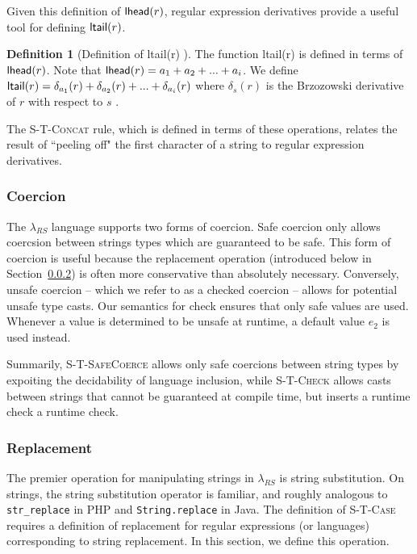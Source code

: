 \documentclass[9pt]{sig-alternate}
\theoremstyle{definition}
\newtheorem{defn}[thm]{Definition}
\newcommand{\lambdas}{\lambda_{RS}}
\newcommand{\lhead}[1]{ {\sf lhead}(#1) }
\newcommand{\ltail}[1]{ {\sf ltail}(#1) }
\begin{document}
Given this definition of $\lhead{r}$, regular expression derivatives provide a useful tool for defining $\ltail{r}$.

\begin{defn}[Definition of \ltail{r}]
The function \ltail{r} is defined in terms of $\lhead{r}$.
Note that $\lhead{r} = a_1 + a_2 + ... + a_i$.
We define $\ltail{r} = \delta_{a_1}(r) + \delta_{a_2}(r) + ... + \delta_{a_i}(r)$
where $\delta_s(r)$ is the Brzozowski derivative of $r$ with respect to $s$ \cite{bowzer}.
\end{defn}

The \textsc{S-T-Concat} rule, which is defined in terms of these operations, relates the result of ``peeling off" the first character of a string to regular expression derivatives.

\subsubsection{Coercion}

The $\lambdas$ language supports two forms of coercion. Safe coercion only allows coercsion between 
strings types which are guaranteed to be safe. This form of coercion is useful because the replacement operation (introduced below in Section~\ref{sec:replace}) is often more conservative than absolutely necessary.
Conversely, unsafe coercion -- which we refer to as a checked coercion -- 
allows for potential unsafe type casts. Our semantics for check ensures that only safe values are used. Whenever a value is determined to be unsafe at runtime, a default value $e_2$ is used instead.

Summarily, 
 \textsc{S-T-SafeCoerce} allows only safe coercions between string types by
    expoiting the decidability of language inclusion, while
\textsc{S-T-Check} allows casts between strings that cannot be guaranteed at compile time, but inserts a runtime check a runtime check.

\subsubsection{Replacement}\label{sec:replace}

The premier operation for manipulating strings in $\lambdas$ is string substitution.
On strings, the string substitution operator is familiar, and roughly analogous to \lstinline{str_replace} in PHP and \lstinline{String.replace} in Java.
The definition of \textsc{S-T-Case} requires a definition of replacement for regular expressions (or languages) corresponding to string replacement.
In this section, we define this operation. 
\end{document}
